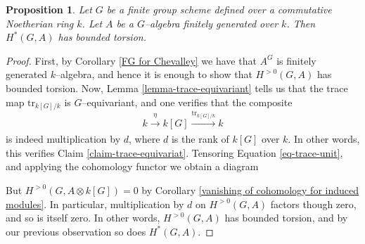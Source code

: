 \documentclass{article}
\theoremstyle{plain}
\newtheorem{Prop}[Th]{Proposition}
\theoremstyle{definition}
\begin{document}


\begin{Prop}
Let $G$ be a finite group scheme defined over a commutative Noetherian ring $k$. Let $A$ be a $G$--algebra finitely generated over $k$. Then $H^\ast(G,A)$ has bounded torsion.     
\end{Prop}

\begin{proof}
    First, by Corollary  \ref{FG for Chevalley} we have that $A^G$ is finitely generated $k$--algebra, and hence it is enough to show that $H^{>0}(G,A)$ has bounded torsion. Now,  Lemma \ref{lemma-trace-equivariant} tells us that the trace map $\mathrm{tr}_{k[G]/k}$ is $G$--equivariant, and one verifies that the composite  
    \begin{equation}\label{eq-trace-unit}
        k\xrightarrow[]{\eta}k[G]\xrightarrow[]{\mathrm{tr}_{k[G]/k}}k
    \end{equation}
    is indeed multiplication by $d$, where $d$ is the rank of $k[G]$ over $k$. In other words, this verifies Claim \ref{claim-trace-equivariat}. 
    Tensoring Equation \ref{eq-trace-unit}, and applying the cohomology functor we obtain a diagram 
    \begin{center}
    \end{center}
    But $H^{>0}(G,A\otimes k[G])=0$ by Corollary \ref{vanishing of cohomology for induced modules}. In particular, multiplication by $d$ on $H^{>0}(G, A)$ factors though zero, and so is itself zero. In other words, $H^{>0}(G,A)$ has bounded torsion, and by our previous observation so does $H^\ast(G,A)$. 
\end{proof}

\pagebreak



\end{document}
